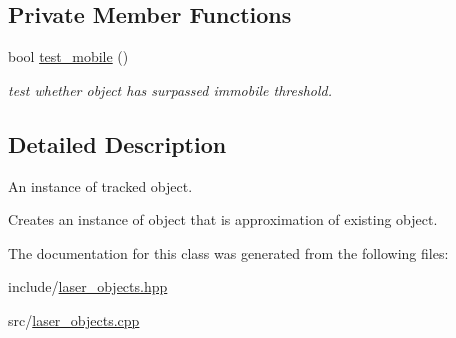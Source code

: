 \subsection*{Private Member Functions}
\begin{DoxyCompactItemize}
\item 
bool \hyperlink{group__laser__object__t_gaaf5e27005d394ba00082e17a0804f3b2}{test\+\_\+mobile} ()
\begin{DoxyCompactList}\small\item\em test whether object has surpassed immobile threshold. \end{DoxyCompactList}\end{DoxyCompactItemize}


\subsection{Detailed Description}
An instance of tracked object. 

Creates an instance of object that is approximation of existing object. 

The documentation for this class was generated from the following files\+:\begin{DoxyCompactItemize}
\item 
include/\hyperlink{laser__objects_8hpp}{laser\+\_\+objects.\+hpp}\item 
src/\hyperlink{laser__objects_8cpp}{laser\+\_\+objects.\+cpp}\end{DoxyCompactItemize}
